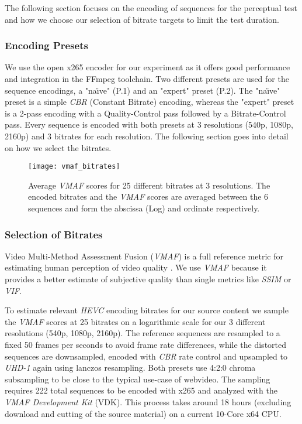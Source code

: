 The following section focuses on the encoding of sequences for the perceptual test and how we choose our selection of bitrate targets to limit the test duration.

\subsubsection{Encoding Presets}
We use the open x265 encoder for our experiment as it offers good performance and integration in the FFmpeg toolchain. Two different presets are used for the sequence encodings, a "na\"{\i}ve" (P.1) and an "expert" preset (P.2). The "na\"{\i}ve" preset is a simple \textit{CBR} (Constant Bitrate) encoding, whereas the "expert" preset is a 2-pass encoding with a Quality-Control pass followed by a Bitrate-Control pass.  Every sequence is encoded with both presets at 3 resolutions (540p, 1080p, 2160p) and 3 bitrates for each resolution. The following section goes into detail on how we select the bitrates.

\begin{figure}[htb!]
	\centering
	\texttt{[image: vmaf\_bitrates]}
	\caption{Average \textit{VMAF} scores for 25 different bitrates at 3 resolutions. The encoded bitrates and the \textit{VMAF} scores are averaged between the 6 sequences and form the abscissa (Log) and ordinate respectively.}
	\label{fig:vmaf:bitrates}
\end{figure}

\subsubsection{Selection of Bitrates}
Video Multi-Method Assessment Fusion (\textit{VMAF}) is a full reference metric for estimating human perception of video quality \cite{lin2013:mmf}. We use \textit{VMAF} because it provides a better estimate of subjective quality than single metrics like \textit{SSIM} or \textit{VIF}.

To estimate relevant \textit{HEVC} encoding bitrates for our source content we sample the \textit{VMAF} scores at 25 bitrates on a logarithmic scale for our 3 different resolutions (540p, 1080p, 2160p). The reference sequences are resampled to a fixed 50 frames per seconds to avoid frame rate differences, while the distorted sequences are downsampled, encoded with \textit{CBR} rate control and upsampled to \textit{UHD-1} again using lanczos resampling. Both presets use 4:2:0 chroma subsampling to be close to the typical use-case of webvideo. The sampling requires 222 total sequences to be encoded with x265 and analyzed with the \textit{VMAF Development Kit} (VDK). This process takes around 18 hours (excluding download and cutting of the source material) on a current 10-Core x64 CPU.

